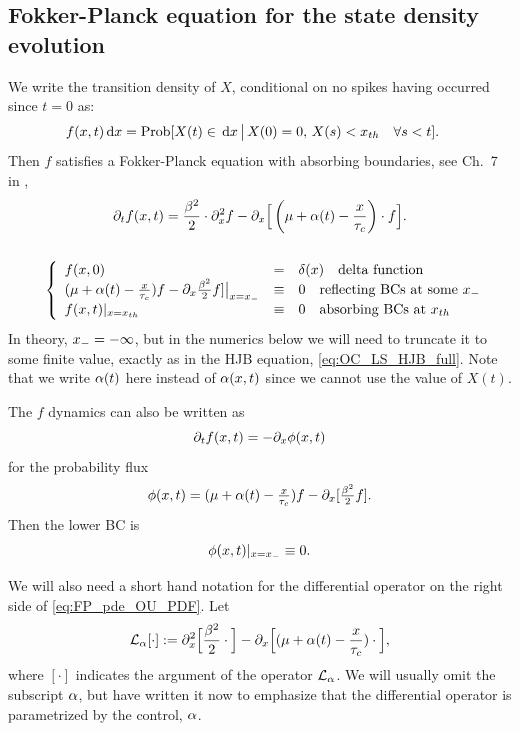\documentclass[12pt]{iopart}
\begin{document}
\subsection{Fokker-Planck equation for the state density evolution}
We write the transition density of $X$, conditional on no
spikes having occurred since $t=0$ as:
\begin{align*}
f(x,t) \, \mathrm{d} x &= \operatorname{Prob}[X(t)\in \, \mathrm{d} x \,\big|\, X(0) = 0,\, X(s) < { x_{th} }
\quad \forall s < t].
\end{align*}
Then $f$ satisfies a Fokker-Planck equation with absorbing boundaries,
see Ch.\ 7 in \cite{Jacobs},
\begin{equation}
\begin{gathered}
{\partial}_t f(x,t) =
				\frac{{\beta}^2 }{2}\cdot {\partial}^2_x f -
				{\partial}_x \Big[ \left( {\mu } + {\alpha}(t)- \frac{x}{{ \tau_{c} }}\right)  \cdot f \Big].
\\
\\
\begin{array}{ll}
	& 
	\left\{ \begin{array}{lcl}
	 f(x,0) &=& \delta(x) \quad \textrm{delta function}
	\\
	({\mu } + {\alpha}(t)- \tfrac x {{ \tau_{c} }})f - {\partial}_x \tfrac {{\beta}^2}2 f] \big|_{x={ x_{-} }} &\equiv&
	0 \quad \textrm{reflecting BCs at some } { x_{-} }
	\\
	f(x,t) |_{x={ x_{th} }} &\equiv& 0 \quad \textrm{absorbing BCs at } { x_{th} }
\end{array} \right.
\end{array}
\label{eq:FP_pde_OU_PDF}
\end{gathered}
\end{equation}
In theory, ${ x_{-} } = -\infty$, but in the numerics below we will need to
truncate it to some finite value, exactly as in the HJB equation,
\cref{eq:OC_LS_HJB_full}.
Note that we write ${\alpha}(t)$ here instead of ${\alpha}(x,t)$ since we cannot use the
value of $X(t)$.

The $f$ dynamics can also be written as
$$
{\partial}_t f(x,t) = - {\partial}_x \phi(x,t)
$$
for the probability flux
$$
\phi(x,t) = ({\mu } + {\alpha}(t) - \tfrac x {{ \tau_{c} }})f - {\partial}_x [\tfrac {{\beta}^2}2 f].
$$
Then the lower BC is
$$
\phi(x,t) |_{x={ x_{-} }} \equiv 0.
$$

We will also need a short hand notation for the differential operator on the
right side of \cref{eq:FP_pde_OU_PDF}. Let
$$ { \mathcal{L} }_{\alpha}[\cdot] := {\partial}^2_x \Big[\frac{{\beta}^2 }{2} \cdot\Big] -
 {\partial}_x \Big[ ({\mu } + {\alpha}(t)- \frac{x}{{ \tau_{c} }}) \cdot \Big],$$
 where
 $[\cdot]$ indicates the argument of the operator ${ \mathcal{L} }_{\alpha}$. We will usually
 omit the subscript ${\alpha}$, but have written it now to emphasize that the
 differential operator is parametrized by the control, ${\alpha}$.
\end{document}
